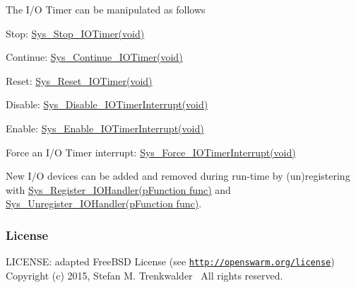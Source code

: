 The I/\+O Timer can be manipulated as follows
\begin{DoxyItemize}
\item Stop\+: \hyperlink{io_8h_a3aa1e95e0e5be1866738b77f5b504652}{Sys\+\_\+\+Stop\+\_\+\+I\+O\+Timer(void)}
\item Continue\+: \hyperlink{io_8h_a15a4d1cf4ffaac43d2c1ae131652b869}{Sys\+\_\+\+Continue\+\_\+\+I\+O\+Timer(void)}
\item Reset\+: \hyperlink{io_8h_a022c90f875bdb0b3cf2c85ab7872f531}{Sys\+\_\+\+Reset\+\_\+\+I\+O\+Timer(void)}
\item Disable\+: \hyperlink{io_8h_a21ac049cc8b67f8851decbbd0edf9dd6}{Sys\+\_\+\+Disable\+\_\+\+I\+O\+Timer\+Interrupt(void)}
\item Enable\+: \hyperlink{io_8h_aefef1e8eb442327a4b4c7bc89d6d13ce}{Sys\+\_\+\+Enable\+\_\+\+I\+O\+Timer\+Interrupt(void)}
\item Force an I/\+O Timer interrupt\+: \hyperlink{io_8h_ac23e12fcd2478b2d820aa55dcd9460ee}{Sys\+\_\+\+Force\+\_\+\+I\+O\+Timer\+Interrupt(void)}
\end{DoxyItemize}

New I/\+O devices can be added and removed during run-\/time by (un)registering with \hyperlink{io_8h_a915425274eaebb4ed39d8622b90993b7}{Sys\+\_\+\+Register\+\_\+\+I\+O\+Handler(p\+Function func)} and \hyperlink{io_8h_a1b695aa5cbdf06b543b10b9661722d36}{Sys\+\_\+\+Unregister\+\_\+\+I\+O\+Handler(p\+Function func)}.\hypertarget{group__io_io_license}{}\subsubsection{License}\label{group__io_io_license}
L\+I\+C\+E\+N\+S\+E\+: adapted Free\+B\+S\+D License (see \href{http://openswarm.org/license}{\tt http\+://openswarm.\+org/license})~\newline
Copyright (c) 2015, Stefan M. Trenkwalder~\newline
All rights reserved. 